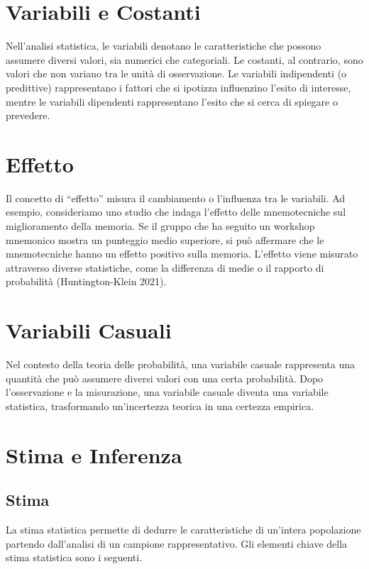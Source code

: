 \documentclass[
  letterpaper,
  krantz2]{{[}./krantz{]}}
\begin{document}
\section{Variabili e Costanti}\label{variabili-e-costanti}

Nell'analisi statistica, le variabili denotano le caratteristiche che
possono assumere diversi valori, sia numerici che categoriali. Le
costanti, al contrario, sono valori che non variano tra le unità di
osservazione. Le variabili indipendenti (o predittive) rappresentano i
fattori che si ipotizza influenzino l'esito di interesse, mentre le
variabili dipendenti rappresentano l'esito che si cerca di spiegare o
prevedere.

\section{Effetto}\label{effetto}

Il concetto di ``effetto'' misura il cambiamento o l'influenza tra le
variabili. Ad esempio, consideriamo uno studio che indaga l'effetto
delle mnemotecniche sul miglioramento della memoria. Se il gruppo che ha
seguito un workshop mnemonico mostra un punteggio medio superiore, si
può affermare che le mnemotecniche hanno un effetto positivo sulla
memoria. L'effetto viene misurato attraverso diverse statistiche, come
la differenza di medie o il rapporto di probabilità (Huntington-Klein
2021).

\section{Variabili Casuali}\label{variabili-casuali}

Nel contesto della teoria delle probabilità, una variabile casuale
rappresenta una quantità che può assumere diversi valori con una certa
probabilità. Dopo l'osservazione e la misurazione, una variabile casuale
diventa una variabile statistica, trasformando un'incertezza teorica in
una certezza empirica.

\section{Stima e Inferenza}\label{stima-e-inferenza}

\subsection{Stima}\label{stima}

La stima statistica permette di dedurre le caratteristiche di un'intera
popolazione partendo dall'analisi di un campione rappresentativo. Gli
elementi chiave della stima statistica sono i seguenti.
\end{document}
